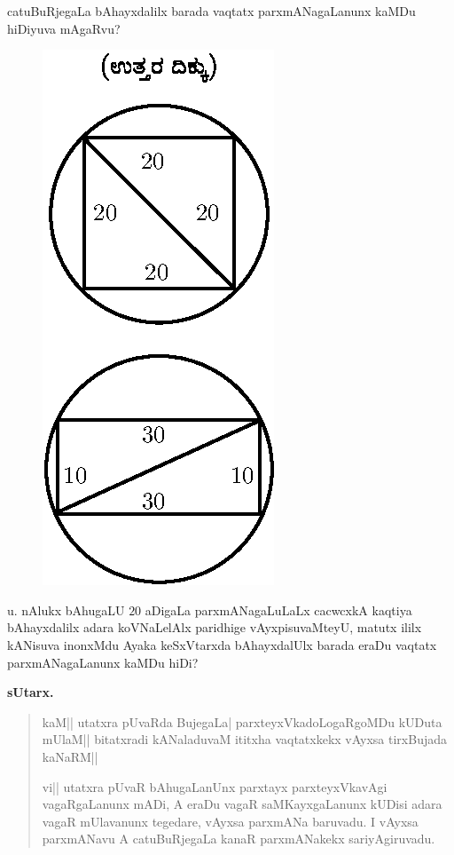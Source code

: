 catuBuRjegaLa bAhayxdalilx barada vaqtatx parxmANagaLanunx kaMDu
hiDiyuva mAgaRvu?
\begin{figure}[H]
\centering
\includegraphics{figure/fig33.eps}
\end{figure}

u. nAlukx bAhugaLU $20$ aDigaLa parxmANagaLuLaLx cacwcxkA kaqtiya
bAhayxdalilx adara koVNaLelAlx paridhige vAyxpisuvaMteyU, matutx
ililx kANisuva inonxMdu Ayaka keSxVtarxda bAhayxdalUlx barada eraDu
vaqtatx parxmANagaLanunx kaMDu hiDi?

\medskip
\begin{center}
{\large\bf sUtarx.}
\end{center}

\begin{verse}
kaM|| utatxra pUvaRda BujegaLa| parxteyxVkadoLogaRgoMDu kUDuta mUlaM||
bitatxradi kANaladuvaM ititxha vaqtatxkekx vAyxsa tirxBujada kaNaRM||

vi|| utatxra pUvaR bAhugaLanUnx parxtayx parxteyxVkavAgi vagaRgaLanunx
mADi, A eraDu vagaR saMKayxgaLanunx kUDisi adara vagaR mUlavanunx
tegedare, vAyxsa parxmANa baruvadu. I vAyxsa parxmANavu A
catuBuRjegaLa kanaR parxmANakekx sariyAgiruvadu.
\end{verse}

